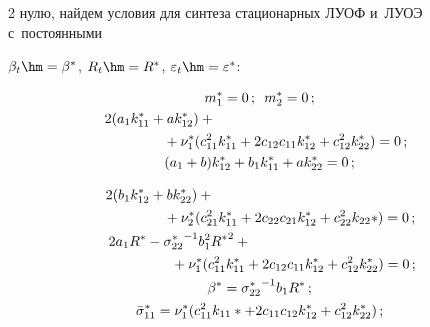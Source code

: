 \begin{multicols}{2}
нулю, найдем условия для синтеза стационарных ЛУОФ и~ЛУОЭ с~постоянными

$\beta_t \hm=\beta^*$, $R_t\hm=R^*$, $\varepsilon_t\hm=\varepsilon^*$:

\begin{gather*}

m_1^* =0\,;\enskip m_2^* = 0\,; %

\\

2(a_1 k_{11}^* + a k_{12}^*) + {}\hspace*{50mm}\\

\hspace*{13mm}{}+\nu_1^*(c_{11}^2 k_{11}^* + 2 c_{12} c_{11} k_{12}^* + c_{12}^2 k_{22}^*)=

0\,;\\

(a_1 + b) k_{12}^* + b_1 k_{11}^* + a k_{22}^* =0\,;

\end{gather*}



\noindent

\begin{gather*}

2(b_1k_{12}^* + b k_{22}^*) + {}\hspace*{50mm}\\

\hspace*{15mm}{}+\nu_2^* (c_{21}^2 k_{11}^* + 2 c_{22} c_{21} k_{12}^*+ c_{22}^2 k_{22}*)

=0\,; %

\\

   \hspace*{-40mm}2a_1 R^* - {\sigma_{22}^*}^{-1} b_1^2 {R^*}^2 +{}\\

\hspace*{17mm}{}+\nu_1^* (c_{11}^2 k_{11}^* + 2 c_{12} c_{11} k_{12}^* + c_{12}^2 k_{22}^*) =0\,; %

  \\

    \beta^* ={\sigma_{22}^*}^{-1} b_1 R^*\,; %

    \\

    \bar \sigma_{11}^* = \nu_1^* ( c_{11}^2 k_{11}* + 2 c_{11} c_{12} k_{12}^* + c_{12}^2 k_{22}^*)\,; %


\end{gather*}
\end{multicols}
